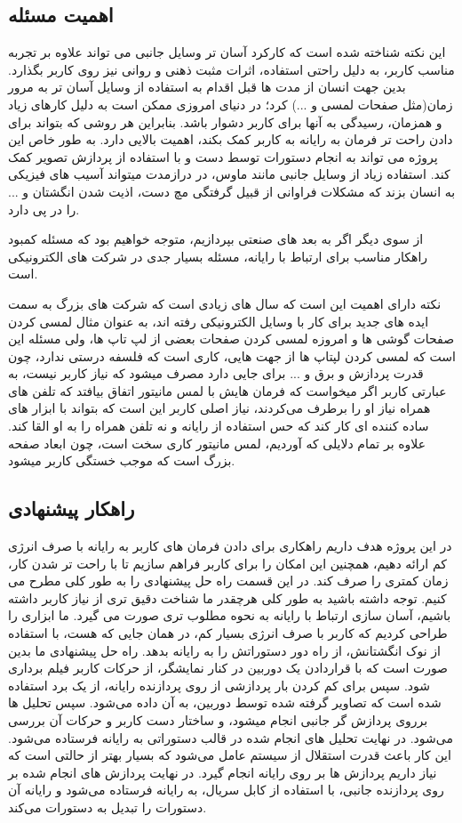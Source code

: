 \documentclass{article}
\begin{document}
\subsection{اهمیت مسئله}
این نکته شناخته شده است که کارکرد آسان تر وسایل جانبی می تواند علاوه بر تجربه مناسب کاربر، به دلیل راحتی استفاده، اثرات مثبت ذهنی و روانی نیز روی کاربر بگذارد. بدین جهت انسان از مدت ها قبل اقدام به استفاده از وسایل آسان تر به مرور زمان(مثل صفحات لمسی و ...) کرد؛ در دنیای امروزی ممکن است به دلیل کارهای زیاد و همزمان، رسیدگی به آنها برای کاربر دشوار باشد. بنابراین هر روشی که بتواند برای دادن راحت تر فرمان به رایانه به کاربر کمک بکند، اهمیت بالایی دارد. به طور خاص این پروژه می تواند به انجام دستورات توسط دست و با استفاده از پردازش تصویر کمک کند. استفاده زیاد از وسایل جانبی مانند ماوس، در درازمدت میتواند آسیب های فیزیکی به انسان بزند که مشکلات فراوانی از قبیل گرفتگی مچ دست، اذیت شدن انگشتان و ... را در پی دارد.

از سوی دیگر اگر به بعد های صنعتی بپردازیم، متوجه خواهیم بود که مسئله کمبود راهکار مناسب برای ارتباط با رایانه، مسئله بسیار جدی در شرکت های الکترونیکی است.

نکته دارای اهمیت این است که سال های زیادی است که شرکت های بزرگ به سمت ایده های جدید برای کار با وسایل الکترونیکی رفته اند، به عنوان مثال لمسی کردن صفحات گوشی ها و امروزه لمسی کردن صفحات بعضی از لپ تاپ ها، ولی مسئله این است که لمسی کردن لپتاپ ها از جهت هایی، کاری است که فلسفه درستی ندارد، چون قدرت پردازش و برق و ... برای جایی دارد مصرف میشود که نیاز کاربر نیست، به عبارتی کاربر اگر میخواست که فرمان هایش با لمس مانیتور اتفاق بیافتد که تلفن های همراه نیاز او را برطرف می‌کردند، نیاز اصلی کاربر این است که بتواند با ابزار های ساده کننده ای کار کند که حس استفاده از رایانه و نه تلفن همراه را به او القا کند. علاوه بر تمام دلایلی که آوردیم، لمس مانیتور کاری سخت است، چون ابعاد صفحه بزرگ است که موجب خستگی کاربر میشود.

\subsection{راهکار پیشنهادی}
در این پروژه هدف داریم راهکاری برای دادن فرمان های کاربر به رایانه با صرف انرژی کم ارائه دهیم، همچنین این امکان را برای کاربر فراهم سازیم تا با راحت تر شدن کار، زمان کمتری را صرف کند. در این قسمت راه حل پیشنهادی را به طور کلی مطرح می کنیم. توجه داشته باشید به طور کلی هرچقدر ما شناخت دقیق تری از نیاز کاربر داشته باشیم، آسان سازی ارتباط با رایانه به نحوه مطلوب تری صورت می گیرد. ما ابزاری را طراحی کردیم که کاربر با صرف انرژی بسیار کم، در همان جایی که هست، با استفاده از نوک انگشتانش، از راه دور دستوراتش را به رایانه بدهد. راه حل پیشنهادی ما بدین صورت است که با قراردادن یک دوربین در کنار نمایشگر، از حرکات کاربر فیلم برداری شود. سپس برای کم کردن بار پردازشی از روی پردازنده رایانه، از یک برد  استفاده شده است که تصاویر گرفته شده توسط دوربین، به آن داده می‌شود. سپس تحلیل ها برروی پردازش گر جانبی انجام میشود، و ساختار دست کاربر و حرکات آن بررسی می‌شود. در نهایت تحلیل های انجام شده در قالب دستوراتی به رایانه فرستاده می‌شود. این کار باعث قدرت استقلال از سیستم عامل می‌شود که بسیار بهتر از حالتی است که نیاز داریم پردازش ها بر روی رایانه انجام گیرد.
در نهایت پردازش های انجام شده بر روی پردازنده جانبی، با استفاده از کابل سریال، به رایانه فرستاده می‌شود و رایانه آن دستورات را تبدیل به دستورات  می‌کند.
\end{document}
